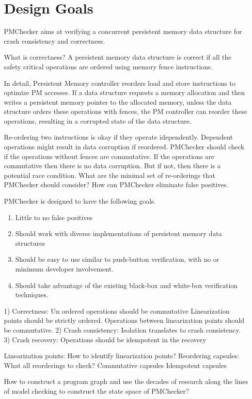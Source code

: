 \section{Design Goals}

PMChecker aims at verifying a concurrent persistent memory data structure
for crash consistency and correctness.

What is correctness?
A persistent memory data structure is correct if all the safety critical
operations are ordered using memory fence instructions.

In detail, Persistent Memory controller reorders load and store instructions
to optimize PM accesses. If a data structure requests a memory allocation
and then writes a persistent memory pointer to the allocated memory,
unless the data structure orders these operations with fences,
the PM controller can reorder these operations, resulting in a corrupted
state of the data structure.

Re-ordering two instructions is okay if they operate idependently.
Dependent operations might result in data corruption if reordered.
PMChecker should check if the operations without fences are commutative.
If the operations are commutative then there is no data corruption.
But if not, then there is a potential race condition.
What are the minimal set of re-orderings that PMChecker should consider?
How can PMChecker eliminate false positives.

PMChecker is designed to have the following goals.
\begin{enumerate}
	\item Little to no false positives
	\item Should work with diverse implementations of 
		persistent memory data structures
	\item Should be easy to use similar to push-button verification,
		with no or minimum developer involvement.
	\item Should take advantage of the existing black-box and
		white-box verification techniques.
\end{enumerate}

1) Correctness: Un ordered operations should be commutative
Linearization points should be strictly ordered.
Operations between linearization points should be commutative.
2) Crash consistency: Isolation translates to crash consistency.
3) Crash recovery: Operations should be idempotent in the recovery


Linearization points: How to identify linearization points?
Reordering capsules: What all reorderings to check?
Commutative capsules
Idempotent capsules

How to construct a program graph and use the decades of research
along the lines of model checking to construct the state space
of PMChecker? 
